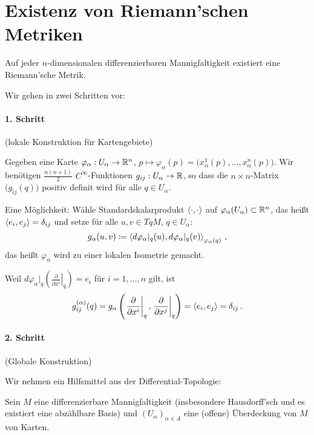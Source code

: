 \documentclass[a4paper,twoside,DIV15,BCOR12mm]{scrbook}
\renewcommand{\da}{\coloneqq}
\begin{document}
\section{Existenz von Riemann’schen Metriken}

\begin{satz}
Auf jeder $n$-dimensionalen differenzierbaren Mannigfaltigkeit existiert eine Riemann’sche Metrik.
\label{exriemet}
\end{satz}

\begin{beweis}
Wir gehen in zwei Schritten vor: %
\paragraph*{1. Schritt} (lokale Konstruktion für Kartengebiete)

Gegeben eine Karte $\varphi_\alpha: U_\alpha \to \mathbb{R}^n$, $p\mapsto \varphi_\alpha(p) = \big(x^1_\alpha(p),\ldots,x^n_\alpha(p)\big)$. Wir benötigen $\frac{n(n+1)}2$ $C^\infty$-Funktionen $g_{ij}: U_\alpha \to \mathbb{R}$, so dass die $n\times n$-Matrix $\big(g_{ij}(q)\big)$ positiv definit wird für alle $q\in U_\alpha$.

Eine Möglichkeit: Wähle Standardskalarprodukt $\langle\cdot,\cdot\rangle$ auf $\varphi_\alpha(U_\alpha)\subset \mathbb{R}^n$, das heißt $\langle e_i,e_j\rangle = \delta_{ij}$ und setze für alle $u,v\in TqM$, $q\in U_\alpha$:
\[
g_\alpha(u,v) \da \lsp {d\varphi_{\alpha}|_q(u)} {d\varphi_{\alpha}|_q(v)} _{\varphi_\alpha(q)}\,,
\]
das heißt $\varphi_\alpha$ wird zu einer lokalen Isometrie gemacht.

Weil $d\varphi_\alpha|_q (\left.\frac\partial{\partial x^i}\right|_q) = e_i$ für $i=1,\ldots,n$ gilt, ist
\[
g_{ij}^{(\alpha)}(q) = g_\alpha\left( \left.\frac\partial{\partial x^i}\right|_q, \left.\frac\partial{\partial x^j}\right|_q \right) = \langle e_i,e_j\rangle = \delta_{ij}\,.
\]

\paragraph*{2. Schritt} (Globale Konstruktion)

Wir nehmen ein Hilfsmittel aus der Differential-Topologie:
\begin{satz}
\label{einszerl}
Sein $M$ eine differenzierbare Mannigfaltigkeit (insbesondere Hausdorff’sch und es existiert eine abzählbare Basis) und $(U_\alpha)_{\alpha\in A}$ eine (offene) Überdeckung von $M$ von Karten.


\end{satz}
\end{beweis}
\end{document}
